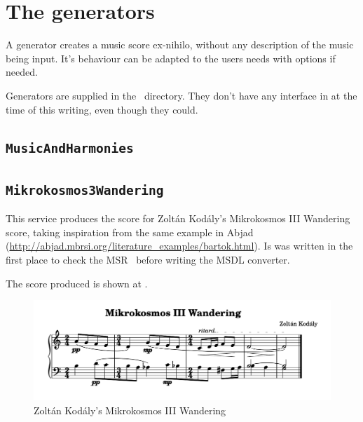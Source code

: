 
\chapter{The generators}%

A generator creates a music score ex-nihilo, without any description of the music being input. It's behaviour can be adapted to the users needs with options if needed.

Generators are supplied in the \generators\ directory. They don't have any interface in at the time of this writing, even though they could. %


\section{{\tt MusicAndHarmonies}}



\section{{\tt Mikrokosmos3Wandering}}

This service produces the score for Zoltán Kodály's Mikrokosmos III Wandering score, taking inspiration from the same example in Abjad (\url{http://abjad.mbrsi.org/literature_examples/bartok.html}).
Is was written in the first place to check the MSR \API\ before writing the MSDL converter.

The score produced is shown at .
\begin{figure}[htbp]
\begin{center}
\includegraphics[scale=0.9]{../graphics/MikrokosmosIIIWandering.png}
\caption{Zoltán Kodály's Mikrokosmos III Wandering}
\label{Zoltán Kodály's Mikrokosmos III Wandering}
\end{center}
\end{figure}


